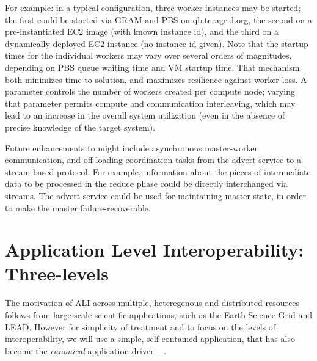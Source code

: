 \documentclass[3p,twocolumn]{elsarticle}
\begin{document}
For example: in a typical configuration, three worker instances may
be started; the first could be started via GRAM and PBS on
qb.teragrid.org, the second on a pre-instantiated EC2 image
(with known instance id), and the third on a dynamically deployed
EC2 instance (no instance id given).  Note that the startup times for
the individual workers may vary over several orders of magnitudes,
depending on PBS queue waiting time and VM startup time.  
That mechanism both minimizes time-to-solution, and
maximizes resilience against worker loss.
%
%
A parameter controls the number of workers created per compute node;
varying that parameter permits compute and communication interleaving,
which may lead to an increase in the overall system utilization (even
in the absence of precise knowledge of the target system).

Future enhancements to \sagamapreduce might include asynchronous master-worker
communication, and off-loading coordination tasks from the advert service to
a stream-based protocol.  For example, information about the pieces of
intermediate data to be processed in the reduce phase could be directly
interchanged via streams.  The advert service could be used for maintaining
master state, in order to make the master failure-recoverable.


\section{Application Level Interoperability: Three-levels}
\label{sec:interop}

The motivation of ALI across multiple, heteregenous and distributed
resources follows from large-scale scientific applications, such as
the Earth Science Grid and LEAD. However for simplicity of treatment
and to focus on the levels of interoperability, we will use a simple,
self-contained application, that has also become the {\it canonical}
\mr application-driver -- \wc.
\end{document}
